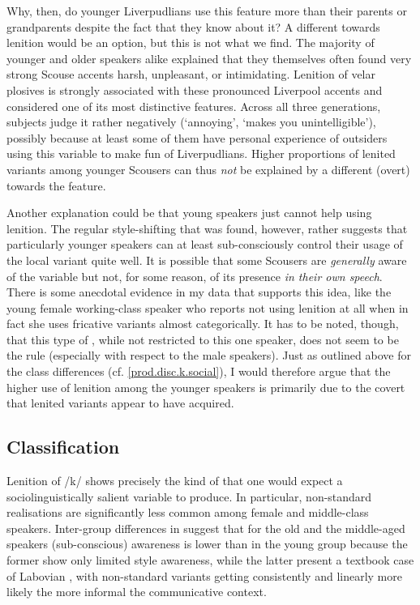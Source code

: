 Why, then, do younger Liverpudlians use this feature more than their parents or grandparents despite the fact that they know about it?
A different  towards lenition would be an option, but this is not what we find.
The majority of younger and older speakers alike explained that they themselves often found very strong Scouse accents harsh, unpleasant, or intimidating.
Lenition of velar plosives is strongly associated with these pronounced Liverpool accents and considered one of its most distinctive features.
Across all three generations, subjects judge it rather negatively (`annoying', `makes you unintelligible'), possibly because at least some of them have personal experience of outsiders using this variable to make fun of Liverpudlians.
Higher proportions of lenited variants among younger Scousers can thus \emph{not} be explained by a different (overt)  towards the feature.

Another explanation could be that young speakers just cannot help using lenition.
The regular style-shifting that was found, however, rather suggests that particularly younger speakers can at least sub-consciously control their usage of the local variant quite well.
It is possible that some Scousers are \emph{generally} aware of the variable but not, for some reason, of its presence \emph{in their own speech}.
There is some anecdotal evidence in my data that supports this idea, like the young female working-class speaker who reports not using lenition at all when in fact she uses fricative variants almost categorically.
It has to be noted, though, that this type of , while not restricted to this one speaker, does not seem to be the rule (especially with respect to the male speakers).
Just as outlined above for the class differences (cf. \ref{prod.disc.k.social}), I would therefore argue that the higher use of lenition among the younger speakers is primarily due to the covert  that lenited variants appear to have acquired.

\subsection{Classification}
\label{prod.disc.k.classification}

Lenition of /k/ shows precisely the kind of  that one would expect a sociolinguistically salient variable to produce.
In particular, non-standard realisations are significantly less common among female and middle-class speakers.
Inter-group differences in  suggest that for the old and the middle-aged speakers (sub-conscious) awareness is lower than in the young group because the former show only limited style awareness, while the latter present a textbook case of Labovian , with non-standard variants getting consistently and linearly more likely the more informal the communicative context.

